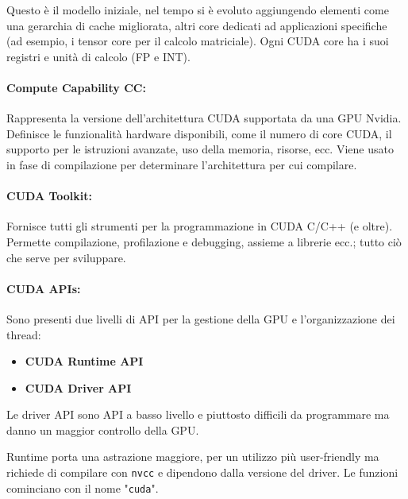 Questo è il modello iniziale, nel tempo si è evoluto aggiungendo elementi come una gerarchia di cache migliorata, altri core dedicati ad applicazioni specifiche (ad esempio, i tensor core per il calcolo matriciale). Ogni CUDA core ha i suoi registri e unità di calcolo (FP e INT).

\paragraph{Compute Capability CC:} Rappresenta la versione dell'architettura CUDA supportata da una GPU Nvidia. Definisce le funzionalità hardware disponibili, come il numero di core CUDA, il supporto per le istruzioni avanzate, uso della memoria, risorse, ecc. Viene usato in fase di compilazione per determinare l'architettura per cui compilare.

\paragraph{CUDA Toolkit:} Fornisce tutti gli strumenti per la programmazione in CUDA C/C++ (e oltre). Permette compilazione, profilazione e debugging, assieme a librerie ecc.; tutto ciò che serve per sviluppare.

\paragraph{CUDA APIs:} Sono presenti due livelli di API per la gestione della GPU e l'organizzazione dei thread:
\begin{itemize}
	\item \textbf{CUDA Runtime API}
	\item \textbf{CUDA Driver API}
\end{itemize}
Le driver API sono API a basso livello e piuttosto difficili da programmare ma danno un maggior controllo della GPU.

Runtime porta una astrazione maggiore, per un utilizzo più user-friendly ma richiede di compilare con \texttt{nvcc} e dipendono dalla versione del driver. Le funzioni cominciano con il nome "\texttt{cuda}".